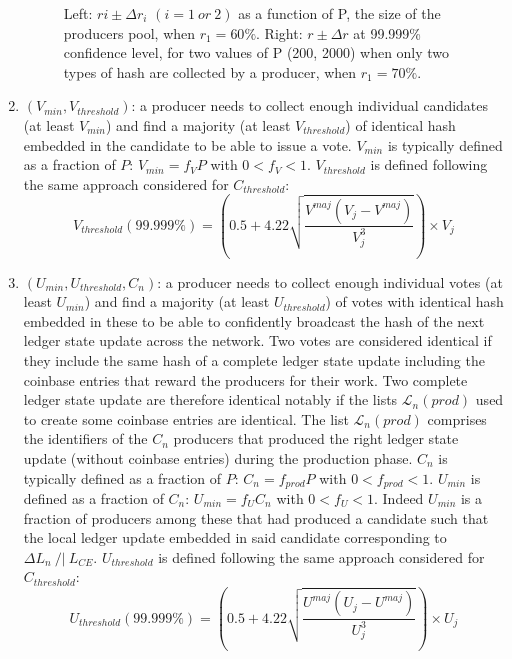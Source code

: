 \begin{enumerate}
\begin{figure}[H]
    \caption{Left: $ri \pm \Delta r_i$ $(i=1~or~2)$ as a function of P, the  size of the producers pool, when $r_1 = 60\%$. Right: $r \pm \Delta r$ at 99.999\% confidence level, for two values of P (200, 2000) when only two types of hash are collected by a producer, when $r_1 = 70\%$.}
    \label{fig:rdeltar}
\end{figure}


\item $(V_{min}, V_{threshold})$: a producer needs to collect enough individual candidates (at least $V_{min}$) and find a majority (at least $V_{threshold}$) of identical hash embedded in the candidate to be able to issue a vote. 
$V_{min}$ is typically defined as a fraction of $P$: $V_{min} = f_V P$ with $0 < f_V < 1$. $V_{threshold}$ is defined following the same approach considered for $C_{threshold}$: 
 \begin{equation}
 V_{threshold}(99.999\%) = \left( 0.5 +  4.22\sqrt{\frac{V^{maj}(V_j-V^{maj})}{V_j^3}} \right) \times V_j
 \end{equation}
 
 \item $(U_{min}, U_{threshold}, C_n)$: a producer needs to collect enough individual votes (at least $U_{min}$) and find a majority (at least $U_{threshold}$) of votes with identical hash embedded in these to be able to confidently broadcast the hash of the next ledger state update across the network. Two votes are considered identical if they include the same hash of a complete ledger state update including the coinbase entries that reward the producers for their work. Two complete ledger state update are therefore identical notably if the lists $\mathcal{L}_{n}(prod)$ used to create some coinbase entries are identical. The list $\mathcal{L}_{n}(prod)$ comprises the identifiers of the $C_n$ producers that produced the right ledger state update (without coinbase entries) during the production phase. $C_{n}$ is typically defined as a fraction of $P$: $C_{n} = f_{prod}P$ with $0 < f_{prod} < 1$.
 $U_{min}$ is defined as a fraction of $C_n$: $U_{min} = f_U C_n$ with $0 < f_U < 1$. Indeed $U_{min}$ is a fraction of producers among these that had produced a candidate such that the local ledger update embedded in said candidate corresponding to $\Delta L_n~/|~L_{CE}$.  $U_{threshold}$ is defined following the same approach considered for $C_{threshold}$: 
 \begin{equation}
 U_{threshold}(99.999\%) = \left( 0.5 +  4.22\sqrt{\frac{U^{maj}(U_j-U^{maj})}{U_j^3}} \right) \times U_j
 \end{equation}

\end{enumerate}

